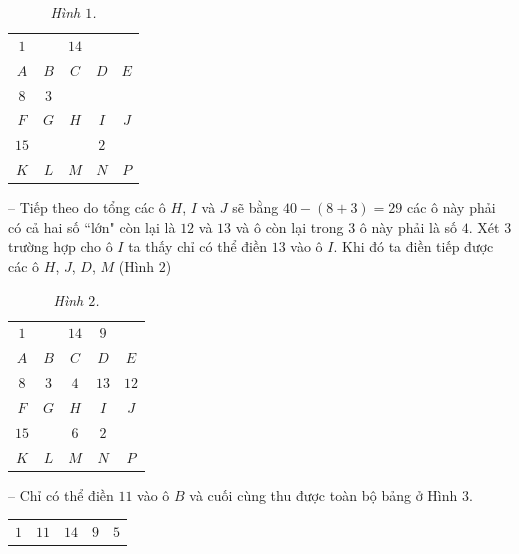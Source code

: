 \begin{multicols}{2}
	\begin{table}[H]
		\vspace*{-5pt}
		\centering
		\captionsetup{labelformat= empty, justification=centering}
		\renewcommand{\arraystretch}{1.23}
		\begin{tabular}{|c|c|c|c|c|}
			\hline
			$1$ & & $14$& & \\
			$A$&$B$&$C$&$D$& $E$\\
			\hline
			 $8$&$3$&&&\\
			 $F$&$G$&$H$&$I$&$J$\\
			 \hline
			 $15$&&&$2$&\\
			 $K$&$L$&$M$&$N$&$P$\\
			 \hline
		\end{tabular}
		\caption{\small\textit{\color{toancuabi}Hình $1$.}}
		\vspace*{-10pt}
	\end{table}
	-- Tiếp theo do tổng các ô $H$, $I$ và $J$ sẽ bằng $40-(8+3)= 29$ các ô này phải có cả hai số ``lớn" còn lại là $12$ và $13$ và ô còn lại trong $3$ ô này phải là số $4$. Xét $3$ trường hợp cho ô $I$ ta thấy chỉ có thể điền $13$ vào ô $I$.  Khi đó ta điền tiếp được các ô $H$, $J$, $D$, $M$ (Hình $2$)
	\begin{table}[H]
		\vspace*{-5pt}
		\centering
		\captionsetup{labelformat= empty, justification=centering}
		\renewcommand{\arraystretch}{1.23}
		\begin{tabular}{|c|c|c|c|c|}
			\hline
			$1$ & & $14$&$9$ & \\
			$A$&$B$&$C$&$D$& $E$\\
			\hline
			$8$&$3$&$4$&$13$&$12$\\
			$F$&$G$&$H$&$I$&$J$\\
			\hline
			$15$&&$6$&$2$&\\
			$K$&$L$&$M$&$N$&$P$\\
			\hline
		\end{tabular}
		\caption{\small\textit{\color{toancuabi}Hình $2$.}}
		\vspace*{-10pt}
	\end{table}
	-- Chỉ có thể điền $11$ vào ô $B$ và cuối cùng thu được toàn bộ bảng ở Hình $3$.
	\begin{table}[H]
		\vspace*{-5pt}
		\centering
		\captionsetup{labelformat= empty, justification=centering}
		\renewcommand{\arraystretch}{1.23}
		\begin{tabular}{|c|c|c|c|c|}
			\hline
			$1$ &$11$&$14$&$9$&$5$ \\

\end{tabular}
\end{table}
\end{multicols}
